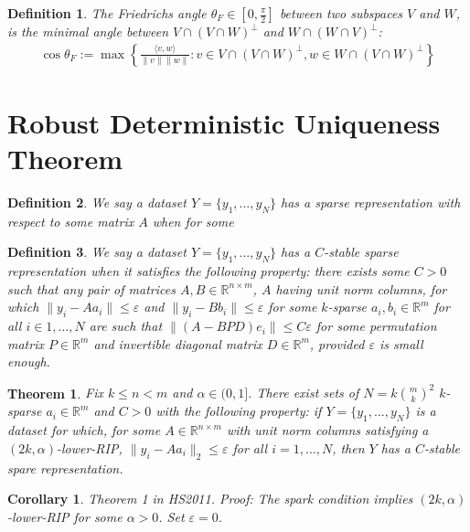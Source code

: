 \documentclass[journal,onecolumn]{IEEEtran}
\newtheorem{theorem}{Theorem}
\newtheorem{definition}{Definition}
\newtheorem{corollary}{Corollary}
\begin{document}
\begin{definition}
The \emph{Friedrichs angle} $\theta_F \in [0,\frac{\pi}{2}]$ between two subspaces $V$ and $W$, is the minimal angle between $V \cap (V \cap W)^\perp$ and $W \cap (W \cap V)^\perp$:
\begin{align}
\cos\theta_F := \max\left\{ \frac{ \langle v, w \rangle }{\|v\|\|w\|}: v \in V \cap (V \cap W)^\perp, w \in W \cap (V \cap W)^\perp \right\}
\end{align}
\end{definition}



\section{Robust Deterministic Uniqueness Theorem}
\begin{definition} 
We say a dataset $Y = \{y_1, ..., y_N \}$ has a \emph{sparse representation} with respect to some matrix $A$ when for some 
\end{definition}

\begin{definition}
We say a dataset $Y = \{y_1, ..., y_N \}$ has a \emph{$C$-stable sparse representation} when it satisfies the following property: there exists some $C > 0$  such that any pair of matrices $A, B \in \mathbb{R}^{n \times m}$, $A$ having unit norm columns, for which $\|y_i - Aa_i\|\leq \varepsilon$ and $\|y_i - Bb_i\| \leq \varepsilon$ for some $k$-sparse $a_i, b_i \in \mathbb{R}^m$ for all $i \in 1, \ldots, N$ are such that $\|(A - BPD)e_i\| \leq C\varepsilon$ for some permutation matrix $P \in \mathbb{R}^m$ and invertible diagonal matrix $D \in \mathbb{R}^m$, provided $\varepsilon$ is small enough.
\end{definition}

\begin{theorem}\label{RobustDUT}
Fix $k \leq n < m$ and $\alpha \in (0,1]$. There exist sets of $N = k {m \choose k}^2$ $k$-sparse $a_i \in \mathbb{R}^m$ and $C > 0$ with the following property: if $Y = \{y_1, ..., y_N \}$ is a dataset for which, for some $A \in \mathbb{R}^{n \times m}$ with unit norm columns satisfying a $(2k, \alpha)$-lower-RIP, $\|y_i - Aa_i\|_2 \leq \varepsilon$ for all $i = 1, \ldots, N$, then $Y$ has a $C$-stable spare representation.
\end{theorem}

\begin{corollary}\label{corollary}
Theorem 1 in HS2011. \emph{Proof:} The spark condition implies $(2k,\alpha)$-lower-RIP for some $\alpha > 0$. Set $\varepsilon = 0$.
\end{corollary}
\end{document}
